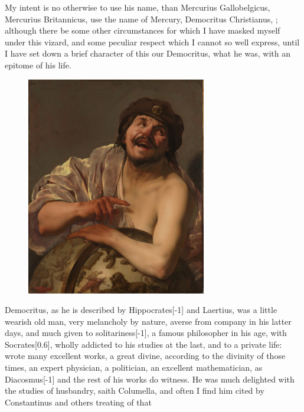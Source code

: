 {My intent is no otherwise to use his name, than Mercurius
Gallobelgicus, Mercurius Britannicus, use the name of Mercury,
Democritus Christianus, \etc; although there be some other
circumstances for which I have masked myself under this vizard, and
some peculiar respect which I cannot so well express, until I have set
down a brief character of this our Democritus, what he was, with an
epitome of his life.
\begin{figure}[H]
  \begingroup
  \centering
  \includegraphics[keepaspectratio,width=0.7\textwidth]{figures/democritus-small.jpg}
  \label{fig:democritus}
\end{figure}
Democritus, as he is described by Hippocrates[-1\baselineskip] and Laertius, was
a little wearish old man, very melancholy by nature, averse from
company in his latter days, and much given to solitariness[-1\baselineskip], a
famous philosopher in his age,  with Socrates[0.6\baselineskip], wholly
addicted to his studies at the last, and to a private life: wrote many
excellent works, a great divine, according to the divinity of those
times, an expert physician, a politician, an excellent mathematician,
as Diacosmus[-1\baselineskip] and the rest of his works do witness. He was much
delighted with the studies of husbandry, saith Columella, and often
I find him cited by Constantinus and others treating of that
}
